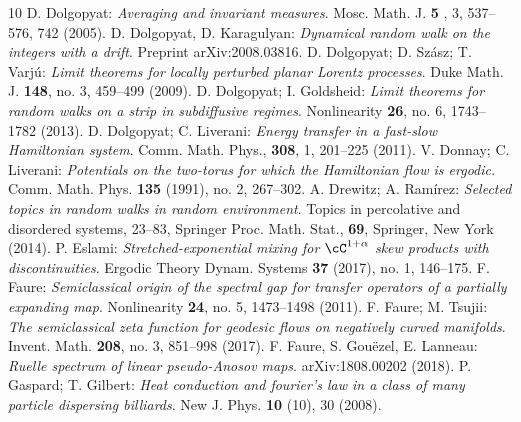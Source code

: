 \begin{thebibliography}{10}
 D. Dolgopyat: {\em Averaging and invariant measures}. Mosc. Math. J. {\bf 5 },   3, 537--576, 742 (2005).
 D. Dolgopyat, D. Karagulyan: {\em Dynamical random walk on the integers with a drift}. Preprint 	arXiv:2008.03816.
 D. Dolgopyat; D. Sz\'asz; T. Varj\'u: {\em Limit theorems for locally perturbed planar Lorentz processes}. Duke Math. J. {\bf 148}, no. 3, 459--499  (2009).
 D. Dolgopyat; I. Goldsheid: {\em Limit theorems for random walks on a strip in subdiffusive regimes}. Nonlinearity {\bf 26}, no. 6, 1743--1782 (2013).
 D. Dolgopyat; C. Liverani: {\em Energy transfer in a fast-slow Hamiltonian system}. Comm. Math. Phys., {\bf 308}, 1, 201--225 (2011).
 V. Donnay; C. Liverani: {\em Potentials on the two-torus for which the Hamiltonian flow is ergodic.}
Comm. Math. Phys. {\bf 135} (1991), no. 2, 267--302.
 A. Drewitz; A. Ram\'irez: {\em Selected topics in random walks in random environment}. Topics in percolative and disordered systems, 23--83, Springer Proc. Math. Stat., {\bf  69}, Springer, New York (2014).
 P. Eslami: {\em Stretched-exponential mixing for $\cC^{1+\alpha}$ skew products with discontinuities}. Ergodic Theory Dynam. Systems {\bf 37} (2017), no. 1, 146--175. 
 F. Faure: {\em Semiclassical origin of the spectral gap for transfer operators of a partially expanding map}. Nonlinearity {\bf 24}, no. 5, 1473--1498  (2011).
 F. Faure; M. Tsujii: {\em The semiclassical zeta function for geodesic flows on negatively curved manifolds}. Invent. Math. {\bf 208}, no. 3, 851--998 (2017).
 F. Faure, S. Gou\"ezel, E. Lanneau: {\em Ruelle spectrum of linear pseudo-Anosov maps}. arXiv:1808.00202  (2018).
 P. Gaspard; T. Gilbert: {\em Heat conduction and fourier's law in a class of many particle dispersing billiards}. New J. Phys. {\bf 10} (10), 30 (2008).

\end{thebibliography}
